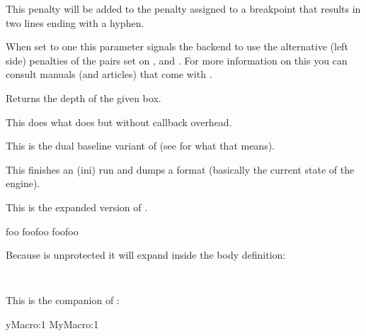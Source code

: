 This penalty will be added to the penalty assigned to a breakpoint that results
in two lines ending with a hyphen.

\stopoldprimitive

\startnewprimitive[title={\prm {doublepenaltymode}}]

When set to one this parameter signals the backend to use the alternative (left
side) penalties of the pairs set on , 
and . For more information on this you can consult manuals
(and articles) that come with \CONTEXT.

\stopnewprimitive

\startoldprimitive[title={\prm {dp}}]

Returns the depth of the given box.

\stopoldprimitive

\startnewprimitive[title={\prm {dpack}}]

This does what  does but without callback overhead.

\stopnewprimitive

\startnewprimitive[title={\prm {dsplit}}]

This is the dual baseline variant of  (see  for what that
means).

\stopnewprimitive

\startoldprimitive[title={\prm {dump}}]

This finishes an (ini) run and dumps a format (basically the current state of the
engine).

\stopoldprimitive

\startoldprimitive[title={\prm {edef}}]

This is the expanded version of .

\startbuffer
\def \foo{foo}      \meaning\foo
\def \ofo{\foo\foo} \meaning\ofo
\edef\oof{\foo\foo} \meaning\oof
\stopbuffer

\typebuffer

Because \type {\foo} is unprotected it will expand inside the body definition:

\startlines \tt
\getbuffer
\stoplines

\stopoldprimitive

\startnewprimitive[title={\prm {edefcsname}}]

This is the companion of :

\starttyping
\expandafter\edef\csname MyMacro:1
             \edefcsname MyMacro:1
\stoptyping

